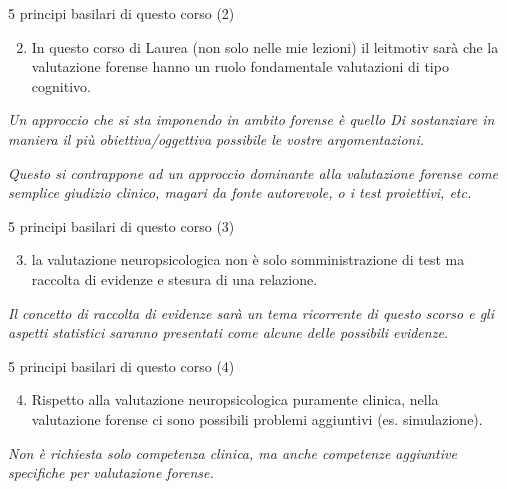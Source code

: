 \documentclass[
  ignorenonframetext,
]{beamer}
\providecommand{\tightlist}{%
  \setlength{\itemsep}{0pt}\setlength{\parskip}{0pt}}
\begin{document}
\begin{frame}{5 principi basilari di questo corso (2)}
\label{principi-basilari-di-questo-corso-2}
\begin{enumerate}
\setcounter{enumi}{1}
\tightlist
\item
  In questo corso di Laurea (non solo nelle mie lezioni) il leitmotiv
  sarà che la valutazione forense hanno un ruolo fondamentale
  valutazioni di tipo cognitivo.
\end{enumerate}

\vspace{3em}

\emph{Un approccio che si sta imponendo in ambito forense è quello Di
sostanziare in maniera il più obiettiva/oggettiva possibile le vostre
argomentazioni.}

\emph{Questo si contrappone ad un approccio dominante alla valutazione
forense come semplice giudizio clinico, magari da fonte autorevole, o i
test proiettivi, etc.}
\end{frame}

\begin{frame}{5 principi basilari di questo corso (3)}
\label{principi-basilari-di-questo-corso-3}
\begin{enumerate}
\setcounter{enumi}{2}
\tightlist
\item
  la valutazione neuropsicologica non è solo somministrazione di test ma
  raccolta di evidenze e stesura di una relazione.
\end{enumerate}

\vspace{3em}

\emph{Il concetto di raccolta di evidenze sarà un tema ricorrente di
questo scorso e gli aspetti statistici saranno presentati come alcune
delle possibili evidenze.}
\end{frame}

\begin{frame}{5 principi basilari di questo corso (4)}
\label{principi-basilari-di-questo-corso-4}
\begin{enumerate}
\setcounter{enumi}{3}
\tightlist
\item
  Rispetto alla valutazione neuropsicologica puramente clinica, nella
  valutazione forense ci sono possibili problemi aggiuntivi (es.
  simulazione). \vspace{3em}
\end{enumerate}

\emph{Non è richiesta solo competenza clinica, ma anche competenze
aggiuntive specifiche per valutazione forense.}
\end{frame}
\end{document}
